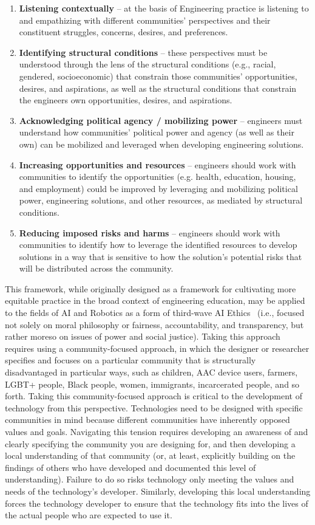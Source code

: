 \documentclass[letterpaper]{article} %
\begin{document}
\begin{enumerate}
    \item \textbf{Listening contextually} -- at the basis of Engineering practice is listening to and empathizing with different communities' perspectives and their constituent struggles, concerns, desires, and preferences.
    \item \textbf{Identifying structural conditions} -- these perspectives must be understood through the lens of the structural conditions (e.g., racial, gendered, socioeconomic) that constrain those communities' opportunities, desires, and aspirations, as well as the structural conditions that constrain the engineers own opportunities, desires, and aspirations.
    \item \textbf{Acknowledging political agency / mobilizing power} -- engineers must understand how communities' political power and agency (as well as their own) can be mobilized and leveraged when developing engineering solutions.
    \item \textbf{Increasing opportunities and resources} -- engineers should work with communities to identify the opportunities (e.g. health, education, housing, and employment) could be improved by leveraging and mobilizing political power, engineering solutions, and other resources, as mediated by structural conditions.
    \item \textbf{Reducing imposed risks and harms} -- engineers should work with communities to identify how to leverage the identified resources to develop solutions in a way that is sensitive to how the solution's potential risks that will be distributed across the community. 
\end{enumerate}

This framework, while originally designed as a framework for cultivating more equitable practice in the broad context of engineering education, may be applied to the fields of AI and Robotics as a form of third-wave AI Ethics~\cite{bennett2020point,le2020we} (i.e., focused not solely on moral philosophy or fairness, accountability, and transparency, but rather moreso on issues of power and social justice). Taking this approach requires using a community-focused approach, in which the designer or researcher specifies and focuses on a particular community that is structurally disadvantaged in particular ways, such as children, AAC device users, farmers, LGBT+ people, Black people, women, immigrants, incarcerated people, and so forth. Taking this community-focused approach is critical to the development of technology from this perspective. Technologies need to be designed with specific communities in mind because different communities have inherently opposed values and goals. Navigating this tension requires developing an awareness of and clearly specifying the community you are designing for, and then developing a local understanding of that community (or, at least, explicitly building on the findings of others who have developed and documented this level of understanding). Failure to do so risks technology only meeting the values and needs of the technology's developer. Similarly, developing this local understanding forces the technology developer to ensure that the technology fits into the lives of the actual people who are expected to use it.
\end{document}
